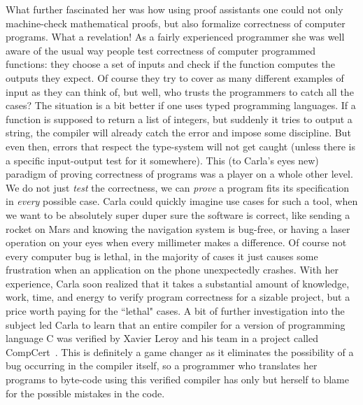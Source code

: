 What further fascinated her was how using proof assistants one could not only machine-check mathematical proofs, but also formalize correctness of computer programs. What a revelation! As a fairly experienced programmer she was well aware of the usual way people test correctness of computer programmed functions: they choose a set of inputs and check if the function computes the outputs they expect. Of course they try to cover as many different examples of input as they can think of, but well, who trusts the programmers to catch all the cases? The situation is a bit better if one uses typed programming languages. If a function is supposed to return a list of integers, but suddenly it tries to output a string, the compiler will already catch the error and impose some discipline. But even then, errors that respect the type-system will not get caught (unless there is a specific input-output test for it somewhere). This (to Carla's eyes new) paradigm of proving correctness of programs was a player on a whole other level. We do not just \emph{test} the correctness, we can \emph{prove} a program fits its specification in \emph{every} possible case.
Carla could quickly imagine use cases for such a tool, when we want to be absolutely super duper sure the software is correct, like sending a rocket on Mars and knowing the navigation system is bug-free, or having a laser operation on your eyes when every millimeter makes a difference. Of course not every computer bug is lethal, in the majority of cases it just causes some frustration when an application on the phone unexpectedly crashes. With her experience, Carla soon realized that it takes a substantial amount of knowledge, work, time, and energy to verify program correctness for a sizable project, but a price worth paying for the ``lethal" cases.
A bit of further investigation into the subject led Carla to learn that an entire compiler for a version of programming language C was verified by Xavier Leroy and his team in a project called CompCert~. This is definitely a game changer as it eliminates the possibility of a bug occurring in the compiler itself, so a programmer who translates her programs to byte-code using this verified compiler has only but herself to blame for the possible mistakes in the code.


